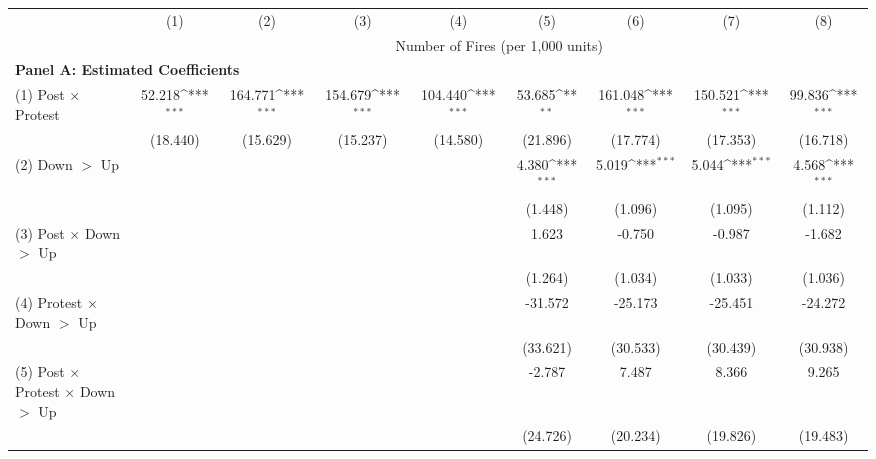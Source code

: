 {
\def\sym#1{\ifmmode^{#1}\else\(^{#1}\)\fi}
\begin{tabular}{l*{8}{c}}
\hline
& (1) & (2) & (3) & (4) & (5) & (6) & (7) & (8) \\
            & \multicolumn{8}{c}{Number of Fires (per 1,000 units)} \\
             \hline
\multicolumn{9}{l}{\textbf{Panel A: Estimated Coefficients}} \\ \hline
(1) Post $\times$ Protest&      52.218\sym{***}&     164.771\sym{***}&     154.679\sym{***}&     104.440\sym{***}&      53.685\sym{**} &     161.048\sym{***}&     150.521\sym{***}&      99.836\sym{***}\\
            &    (18.440)         &    (15.629)         &    (15.237)         &    (14.580)         &    (21.896)         &    (17.774)         &    (17.353)         &    (16.718)         \\
(2) Down $>$ Up&                     &                     &                     &                     &       4.380\sym{***}&       5.019\sym{***}&       5.044\sym{***}&       4.568\sym{***}\\
            &                     &                     &                     &                     &     (1.448)         &     (1.096)         &     (1.095)         &     (1.112)         \\
(3) Post $\times$ Down $>$ Up&                     &                     &                     &                     &       1.623         &      -0.750         &      -0.987         &      -1.682         \\
            &                     &                     &                     &                     &     (1.264)         &     (1.034)         &     (1.033)         &     (1.036)         \\
(4) Protest $\times$ Down $>$ Up&                     &                     &                     &                     &     -31.572         &     -25.173         &     -25.451         &     -24.272         \\
            &                     &                     &                     &                     &    (33.621)         &    (30.533)         &    (30.439)         &    (30.938)         \\
(5) Post $\times$ Protest $\times$ Down $>$ Up&                     &                     &                     &                     &      -2.787         &       7.487         &       8.366         &       9.265         \\
            &                     &                     &                     &                     &    (24.726)         &    (20.234)         &    (19.826)         &    (19.483)         \\





\end{tabular}}
